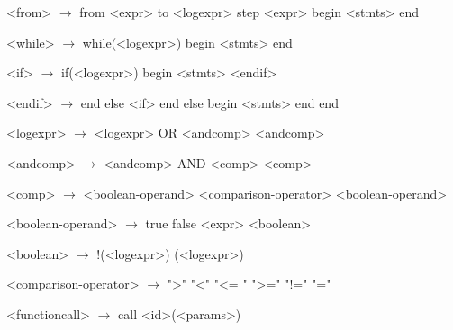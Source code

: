 \documentclass{article}
\begin{document}
\begin{grammar}
<from> $\rightarrow$ from <expr> to <logexpr> step <expr>
	begin
		<stmts>
	end 

<while> $\rightarrow$ while(<logexpr>)
		begin
			<stmts>
		end

<if> $\rightarrow$ if(<logexpr>)
	begin
		<stmts>
	<endif>

<endif> $\rightarrow$ end
	else <if>
	\alt end
	else
	begin
		<stmts>
	end
	\alt end

<logexpr> $\rightarrow$ <logexpr> OR <andcomp>
		\alt <andcomp>

<andcomp> $\rightarrow$ <andcomp> AND <comp>

<comp> $\rightarrow$ <boolean-operand> <comparison-operator> <boolean-operand>

<boolean-operand> $\rightarrow$ true
		\alt false
		\alt <boolean>

<boolean> $\rightarrow$ !(<logexpr>)
		\alt (<logexpr>)

<comparison-operator> $\rightarrow$ ">"
				\alt "<"
				\alt "<= "
				\alt ">="
				\alt "!="
				\alt "="

<functioncall> $\rightarrow$ call <id>(<params>)

\end{grammar}
\end{document}
